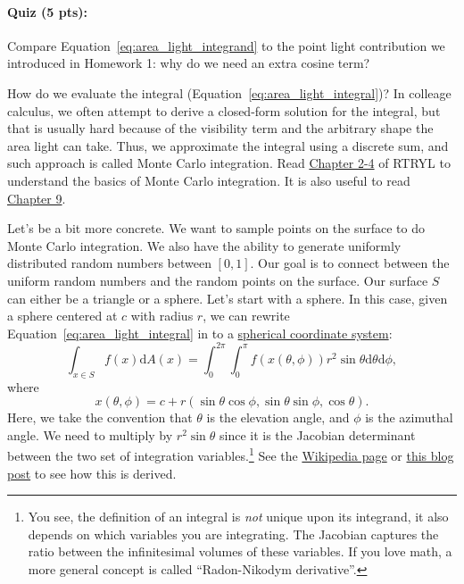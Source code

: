 \paragraph{Quiz (5 pts):} Compare Equation~\eqref{eq:area_light_integrand} to the point light contribution we introduced in Homework 1: why do we need an extra cosine term?

How do we evaluate the integral (Equation~\eqref{eq:area_light_integral})? In colleage calculus, we often attempt to derive a closed-form solution for the integral, but that is usually hard because of the visibility term and the arbitrary shape the area light can take. Thus, we approximate the integral using a discrete sum, and such approach is called Monte Carlo integration. Read \href{https://raytracing.github.io/books/RayTracingTheRestOfYourLife.html#asimplemontecarloprogram}{Chapter 2-4} of RTRYL to understand the basics of Monte Carlo integration. It is also useful to read \href{https://raytracing.github.io/books/RayTracingTheRestOfYourLife.html#samplinglightsdirectly}{Chapter 9}.

Let's be a bit more concrete. We want to sample points on the surface to do Monte Carlo integration.
We also have the ability to generate uniformly distributed random numbers between $[0, 1]$. Our goal is to connect between the uniform random numbers and the random points on the surface.
Our surface $S$ can either be a triangle or a sphere. Let's start with a sphere. In this case, given a sphere centered at $c$ with radius $r$, we can rewrite Equation~\eqref{eq:area_light_integral} in to a \href{https://en.wikipedia.org/wiki/Spherical_coordinate_system}{spherical coordinate system}:
\begin{equation}
	\int_{x \in S} f(x) \mathrm{d}A(x) = \int_{0}^{2\pi}\int_{0}^{\pi} f(x(\theta, \phi)) r^2 \sin\theta \mathrm{d}\theta \mathrm{d} \phi,
	\label{eq:area_light_spherical}
\end{equation}
where
\begin{equation}
	x(\theta, \phi) = c + r \left(\sin\theta \cos\phi, \sin\theta \sin\phi, \cos\theta \right).
\end{equation}
Here, we take the convention that $\theta$ is the elevation angle, and $\phi$ is the azimuthal angle. We need to multiply by $r^2 \sin\theta$ since it is the Jacobian determinant between the two set of integration variables.\footnote{You see, the definition of an integral is \emph{not} unique upon its integrand, it also depends on which variables you are integrating. The Jacobian captures the ratio between the infinitesimal volumes of these variables. If you love math, a more general concept is called ``Radon-Nikodym derivative''.} See the \href{https://en.wikipedia.org/wiki/Spherical_coordinate_system#Integration_and_differentiation_in_spherical_coordinates}{Wikipedia page} or \href{http://6degreesoffreedom.co/circle-random-sampling/}{this blog post} to see how this is derived.


